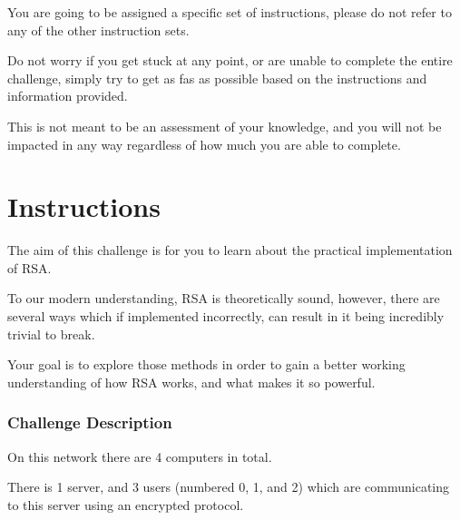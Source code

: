             {\parindent0pt\singlespacing                



                    You are going to be assigned a specific set of instructions, please do not refer to any of the other instruction sets.



                    Do not worry if you get stuck at any point, or are unable to complete the entire challenge, simply try to get as fas as possible based on the instructions and information provided. %



This is not meant to be an assessment of your knowledge, and you will not be impacted in any way regardless of how much you are able to complete. 



                



                \section*{Instructions}



                    The aim of this challenge is for you to learn about the practical implementation of RSA.







                    To our modern understanding, RSA is theoretically sound, however, there are several ways which if implemented incorrectly, can result in it being incredibly trivial to break. 



                    Your goal is to explore those methods in order to gain a better working understanding of how RSA works, and what makes it so powerful. 



                \subsubsection*{Challenge Description}



                    On this network there are 4 computers in total. 



                    There is 1 server, and 3 users (numbered 0, 1, and 2) which are communicating to this server using an encrypted protocol. 



}
